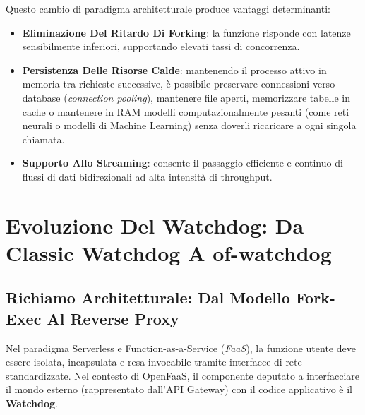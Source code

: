 \documentclass[11pt, a4paper]{article}
\begin{document}
Questo cambio di paradigma architetturale produce vantaggi determinanti:
\begin{itemize}
    \item \textbf{Eliminazione Del Ritardo Di Forking}: la funzione risponde con latenze sensibilmente inferiori, supportando elevati tassi di concorrenza.
    \item \textbf{Persistenza Delle Risorse Calde}: mantenendo il processo attivo in memoria tra richieste successive, è possibile preservare connessioni verso database (\emph{connection pooling}), mantenere file aperti, memorizzare tabelle in cache o mantenere in RAM modelli computazionalmente pesanti (come reti neurali o modelli di Machine Learning) senza doverli ricaricare a ogni singola chiamata.
    \item \textbf{Supporto Allo Streaming}: consente il passaggio efficiente e continuo di flussi di dati bidirezionali ad alta intensità di throughput.
\end{itemize}

\newpage


\section{Evoluzione Del Watchdog: Da Classic Watchdog A of-watchdog}

\subsection{Richiamo Architetturale: Dal Modello Fork-Exec Al Reverse Proxy}
Nel paradigma Serverless e Function-as-a-Service (\emph{FaaS}), la funzione utente deve essere isolata, incapsulata e resa invocabile tramite interfacce di rete standardizzate. Nel contesto di OpenFaaS, il componente deputato a interfacciare il mondo esterno (rappresentato dall'API Gateway) con il codice applicativo è il \textbf{Watchdog}.
\end{document}
